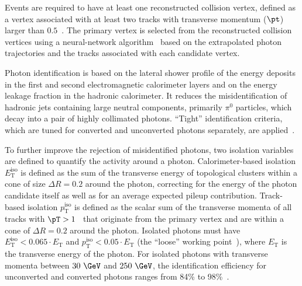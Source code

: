 \documentclass[PAPER, cernpreprint, texlive=2016, paper=a4, USenglish, texmf]{atlasdoc}
\begin{document}
Events are required to have at least one reconstructed collision vertex, defined as a vertex associated with at least two tracks with transverse momentum ($\pt$) larger than $0.5$~\GeV.
The primary vertex is selected from the reconstructed collision vertices using a neural-network algorithm~\cite{HIGG-2013-08} based on the extrapolated photon trajectories and the tracks associated with each candidate vertex.
 
Photon identification is based on the lateral shower profile of the energy deposits in the first and second electromagnetic calorimeter layers and on the energy leakage fraction in the hadronic calorimeter.
It reduces the misidentification of hadronic jets containing large neutral components, primarily $\pi^0$ particles, which decay into a pair of highly collimated photons.
``Tight'' identification criteria, which are tuned for converted and unconverted photons separately, are applied~\cite{EGAM-2018-01}.
 
To further improve the rejection of misidentified photons, two isolation variables are defined to quantify the activity around a photon.
Calorimeter-based isolation $E^{\textrm{iso}}_{\textrm{T}}$ is defined as the sum of the transverse energy of topological clusters within a cone of size $\Delta R = 0.2$ around the photon, correcting for the energy of the photon candidate itself as well as for an average expected pileup contribution.
Track-based isolation $p_{\textrm{T}}^{\textrm{iso}}$ is defined as the scalar sum of the transverse momenta of all tracks with $\pT > 1$~\GeV{} that originate from the primary vertex 
and are within a cone of $\Delta R = 0.2$ around the photon. Isolated photons must have
$E^{\textrm{iso}}_{\textrm{T}} < 0.065\cdot E_\mathrm{T}$ and $p_{\textrm{T}}^{\textrm{iso}} < 0.05\cdot E_\mathrm{T}$ (the ``loose'' working point~\cite{EGAM-2018-01}), where $E_\mathrm{T}$ is the transverse energy of the photon.
For isolated photons with transverse momenta between $30~\GeV$ and $250~\GeV$, the identification efficiency for unconverted and converted photons ranges from 84\% to 98\%~\cite{EGAM-2018-01}.
 
\end{document}
